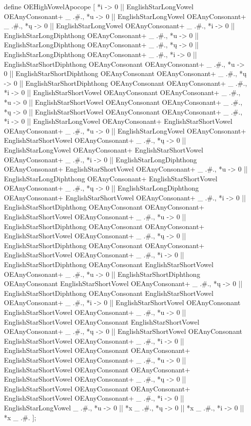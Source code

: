 \documentclass[
  british,
  a4paper,
  openany]{book}
\begin{document}
\begin{ReaderFacingFoma}
define OEHighVowelApocope [
    {*i} -> 0 || EnglishStarLongVowel OEAnyConsonant+ _ .#.,
    {*u} -> 0 || EnglishStarLongVowel OEAnyConsonant+ _ .#.,
    {*ų} -> 0 || EnglishStarLongVowel OEAnyConsonant+ _ .#.,
    {*i} -> 0 || EnglishStarLongDiphthong OEAnyConsonant+ _ .#.,
    {*u} -> 0 || EnglishStarLongDiphthong OEAnyConsonant+ _ .#.,
    {*ų} -> 0 || EnglishStarLongDiphthong OEAnyConsonant+ _ .#.,
    {*i} -> 0 || EnglishStarShortDiphthong OEAnyConsonant OEAnyConsonant+ _ .#.,
    {*u} -> 0 || EnglishStarShortDiphthong OEAnyConsonant OEAnyConsonant+ _ .#.,
    {*ų} -> 0 || EnglishStarShortDiphthong OEAnyConsonant OEAnyConsonant+ _ .#.,
    {*i} -> 0 || EnglishStarShortVowel OEAnyConsonant OEAnyConsonant+ _ .#.,
    {*u} -> 0 || EnglishStarShortVowel OEAnyConsonant OEAnyConsonant+ _ .#.,
    {*ų} -> 0 || EnglishStarShortVowel OEAnyConsonant OEAnyConsonant+ _ .#.,
    {*i} -> 0 || EnglishStarLongVowel OEAnyConsonant+ EnglishStarShortVowel OEAnyConsonant+ _ .#.,
    {*u} -> 0 || EnglishStarLongVowel OEAnyConsonant+ EnglishStarShortVowel OEAnyConsonant+ _ .#.,
    {*ų} -> 0 || EnglishStarLongVowel OEAnyConsonant+ EnglishStarShortVowel OEAnyConsonant+ _ .#.,
    {*i} -> 0 || EnglishStarLongDiphthong OEAnyConsonant+ EnglishStarShortVowel OEAnyConsonant+ _ .#.,
    {*u} -> 0 || EnglishStarLongDiphthong OEAnyConsonant+ EnglishStarShortVowel OEAnyConsonant+ _ .#.,
    {*ų} -> 0 || EnglishStarLongDiphthong OEAnyConsonant+ EnglishStarShortVowel OEAnyConsonant+ _ .#.,
    {*i} -> 0 || EnglishStarShortDiphthong OEAnyConsonant OEAnyConsonant+ EnglishStarShortVowel OEAnyConsonant+ _ .#.,
    {*u} -> 0 || EnglishStarShortDiphthong OEAnyConsonant OEAnyConsonant+ EnglishStarShortVowel OEAnyConsonant+ _ .#.,
    {*ų} -> 0 || EnglishStarShortDiphthong OEAnyConsonant OEAnyConsonant+ EnglishStarShortVowel OEAnyConsonant+ _ .#.,
    {*i} -> 0 || EnglishStarShortDiphthong OEAnyConsonant EnglishStarShortVowel OEAnyConsonant+ _ .#.,
    {*u} -> 0 || EnglishStarShortDiphthong OEAnyConsonant EnglishStarShortVowel OEAnyConsonant+ _ .#.,
    {*ų} -> 0 || EnglishStarShortDiphthong OEAnyConsonant EnglishStarShortVowel OEAnyConsonant+ _ .#.,
    {*i} -> 0 || EnglishStarShortVowel OEAnyConsonant EnglishStarShortVowel OEAnyConsonant+ _ .#.,
    {*u} -> 0 || EnglishStarShortVowel OEAnyConsonant EnglishStarShortVowel OEAnyConsonant+ _ .#.,
    {*ų} -> 0 || EnglishStarShortVowel OEAnyConsonant EnglishStarShortVowel OEAnyConsonant+ _ .#.,
    {*i} -> 0 || EnglishStarShortVowel OEAnyConsonant OEAnyConsonant+ EnglishStarShortVowel OEAnyConsonant+ _ .#.,
    {*u} -> 0 || EnglishStarShortVowel OEAnyConsonant OEAnyConsonant+ EnglishStarShortVowel OEAnyConsonant+ _ .#.,
    {*ų} -> 0 || EnglishStarShortVowel OEAnyConsonant OEAnyConsonant+ EnglishStarShortVowel OEAnyConsonant+ _ .#.,
    {*i} -> 0 || EnglishStarLongVowel _ .#.,
    {*u} -> 0 || {*x} _ .#.,
    {*ų} -> 0 || {*x} _ .#.,
    {*i} -> 0 || {*x} _ .#.
];
\end{ReaderFacingFoma}
\end{document}
